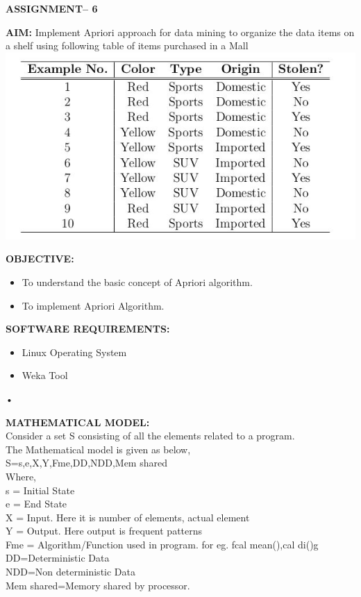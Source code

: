 \documentclass[11pt]{article}
\begin{document}
	
	\begin{center}
		\textbf{ASSIGNMENT– 6}
	\end{center}
	\textbf{AIM:}
	Implement Apriori approach for data mining to organize the data items on a shelf using
	following table of items purchased in a Mall \\ 
	
	\includegraphics{image1}
	
	
	\noindent \textbf{OBJECTIVE:}
	\begin{itemize}
		\item To understand the basic concept of Apriori algorithm.
		\item To implement Apriori Algorithm.
	\end{itemize}
	
	\noindent \textbf{SOFTWARE REQUIREMENTS:}
	\begin{itemize}
		\item Linux Operating System
		\item Weka Tool
	\end{itemize}•
	
	\noindent \textbf{MATHEMATICAL MODEL:} \\
	Consider a set S consisting of all the elements related to a program. \\
	The Mathematical model is given as below, \\
	S={s,e,X,Y,Fme,DD,NDD,Mem shared } \\
	Where, \\
	s = Initial State \\
	e = End State \\
	X = Input. Here it is number of elements, actual element \\
	Y = Output. Here output is frequent patterns \\
	Fme = Algorithm/Function used in program. for eg. fcal mean(),cal di()g \\
	DD=Deterministic Data \\
	NDD=Non deterministic Data \\
	Mem shared=Memory shared by processor. \\
	
\end{document}
